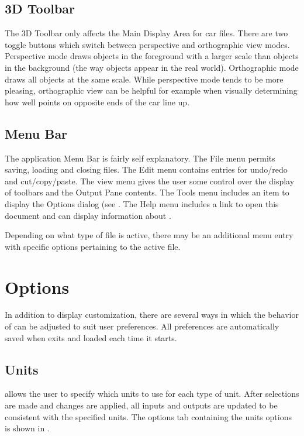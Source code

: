 \subsection{3D Toolbar} \label{ssec:3DToolbar}

The 3D Toolbar only affects the Main Display Area for car files.  There are two toggle buttons which switch between perspective and orthographic view modes.  Perspective mode draws objects in the foreground with a larger scale than objects in the background (the way objects appear in the real world).  Orthographic mode draws all objects at the same scale.  While perspective mode tends to be more pleasing, orthographic view can be helpful for example when visually determining how well points on opposite ends of the car line up.

\subsection{Menu Bar} \label{ssec:menuBar}

The application Menu Bar is fairly self explanatory.  The File menu permits saving, loading and closing files.  The Edit menu contains entries for undo/redo and cut/copy/paste.  The view menu gives the user some control over the display of toolbars and the Output Pane contents.  The Tools menu includes an item to display the Options dialog (see .  The Help menu includes a link to open this document and can display information about \vvase{}.

Depending on what type of file is active, there may be an additional menu entry with specific options pertaining to the active file.

\section{Options} \label{sec:options}

In addition to display customization, there are several ways in which the behavior of \vvase{} can be adjusted to suit user preferences.  All preferences are automatically saved when \vvase{} exits and loaded each time it starts.

\subsection{Units} \label{ssec:optionsUnits}

\vvase{} allows the user to specify which units to use for each type of unit.  After selections are made and changes are applied, all inputs and outputs are updated to be consistent with the specified units.  The options tab containing the units options is shown in .

